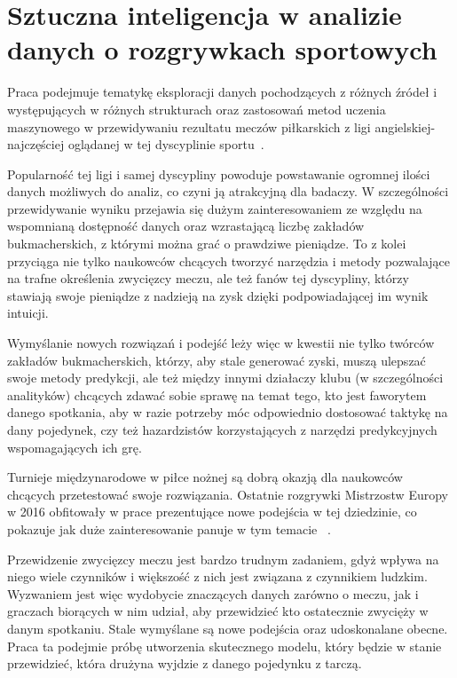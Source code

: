 
\chapter{Sztuczna inteligencja w analizie danych o rozgrywkach sportowych}

\noindent Praca podejmuje tematykę eksploracji danych pochodzących z różnych źródeł i występujących w różnych strukturach oraz zastosowań metod uczenia maszynowego w przewidywaniu rezultatu meczów piłkarskich z ligi angielskiej- najczęściej oglądanej w tej dyscyplinie sportu~\cite{ESPN}.

Popularność tej ligi i samej dyscypliny powoduje powstawanie ogromnej ilości danych możliwych do analiz, co czyni ją atrakcyjną dla badaczy. W szczególności przewidywanie wyniku przejawia się dużym zainteresowaniem ze względu na wspomnianą dostępność danych oraz wzrastającą liczbę zakładów bukmacherskich, z którymi można grać o prawdziwe pieniądze. To z kolei przyciąga nie tylko naukowców chcących tworzyć narzędzia i metody pozwalające na trafne określenia zwycięzcy meczu, ale też fanów tej dyscypliny, którzy stawiają swoje pieniądze z nadzieją na zysk dzięki podpowiadającej im wynik intuicji. 

Wymyślanie nowych rozwiązań i podejść leży więc w kwestii nie tylko twórców zakładów bukmacherskich, którzy, aby stale generować zyski, muszą ulepszać swoje metody predykcji, ale też między innymi działaczy klubu (w szczególności analityków) chcących zdawać sobie sprawę na temat tego, kto jest faworytem danego spotkania, aby w razie potrzeby móc odpowiednio dostosować taktykę na dany pojedynek, czy też hazardzistów korzystających z narzędzi predykcyjnych wspomagających ich grę.

Turnieje międzynarodowe w piłce nożnej są dobrą okazją dla naukowców chcących przetestować swoje rozwiązania. Ostatnie rozgrywki Mistrzostw Europy w 2016 obfitowały w prace prezentujące nowe podejścia w tej dziedzinie, co pokazuje jak duże zainteresowanie panuje w tym temacie~\cite{Euro2016-1} \cite{Euro2016-2}.

Przewidzenie zwycięzcy meczu jest bardzo trudnym zadaniem, gdyż wpływa na niego wiele czynników i większość z nich jest związana z czynnikiem ludzkim. Wyzwaniem jest więc wydobycie znaczących danych zarówno o meczu, jak i graczach biorących w nim udział, aby przewidzieć kto ostatecznie zwycięży w danym spotkaniu. Stale wymyślane są nowe podejścia oraz udoskonalane obecne. Praca ta podejmie próbę utworzenia skutecznego modelu, który będzie w stanie przewidzieć, która drużyna wyjdzie z danego pojedynku z tarczą. 

